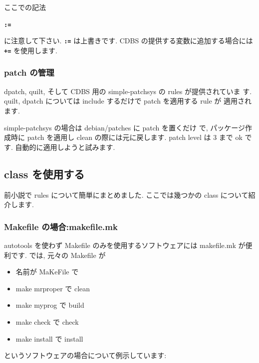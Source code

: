 \documentclass[mingoth,a4paper]{jsarticle}
\begin{document}
ここでの記法
\begin{center}
    {\tt {\bf :=}}
\end{center}
に注意して下さい. 
{\tt {\bf :=}} は上書きです. 
CDBS の提供する変数に追加する場合には {\tt {\bf +=}} を使用します.

\subsubsection{patch の管理}

dpatch, quilt, そして CDBS 用の simple-patchsys の rules が提供されていま
す.  quilt, dpatch については include するだけで patch を適用する rule が
適用されます. 
%

simple-patchsys の場合は debian/patches に patch を置くだけ
で, パッケージ作成時に patch を適用し clean の際には元に戻します.
patch level は 3 まで ok です. 自動的に適用しようと試みます.

\subsection{class を使用する}

前小説で rules について簡単にまとめました. 
ここでは幾つかの class について紹介します.

\subsubsection{Makefile の場合:makefile.mk}

autotools を使わず Makefile のみを使用するソフトウェアには
makefile.mk が便利です. 
\cite{CDBS doc} では,
元々の Makefile が
\begin{itemize}
    \item 名前が MaKeFile で
    \item make mrproper で clean 
    \item make myprog で build
    \item make check  で check
    \item make install で install
\end{itemize}
というソフトウェアの場合について例示しています:
\end{document}
